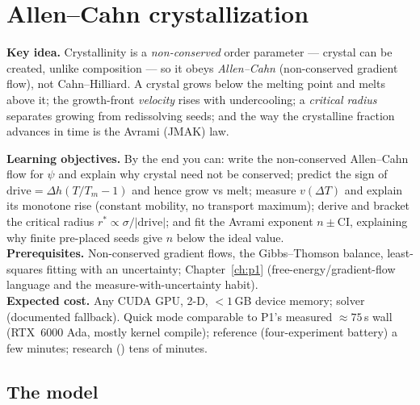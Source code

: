 \chapter{Allen--Cahn crystallization}
\label{ch:p6}

\begin{keybox}
\textbf{Key idea.} Crystallinity is a \emph{non-conserved} order parameter
--- crystal can be created, unlike composition --- so it obeys
\emph{Allen--Cahn} (non-conserved gradient flow), not Cahn--Hilliard. A
crystal grows below the melting point and melts above it; the growth-front
\emph{velocity} rises with undercooling; a \emph{critical radius}
separates growing from redissolving seeds; and the way the crystalline
fraction advances in time is the Avrami (JMAK) law.
\end{keybox}

\begin{keybox}
\textbf{Learning objectives.} By the end you can: write the non-conserved
Allen--Cahn flow for $\psi$ and explain why crystal need not be conserved;
predict the sign of $\text{drive}=\Delta h(T/T_m-1)$ and hence grow vs
melt; measure $v(\Delta T)$ and explain its monotone rise (constant
mobility, no transport maximum); derive and bracket the critical radius
$r^\ast\propto\sigma/|\text{drive}|$; and fit the Avrami exponent
$n\pm$CI, explaining why finite pre-placed seeds give $n$ below the ideal
value.\\[2pt]
\textbf{Prerequisites.} Non-conserved gradient flows, the Gibbs--Thomson
balance, least-squares fitting with an uncertainty; Chapter~\ref{ch:p1}
(free-energy/gradient-flow language and the measure-with-uncertainty
habit).\\[2pt]
\textbf{Expected cost.} Any CUDA GPU, 2-D, $<1$\,GB device memory;
solver  (documented  fallback). Quick mode
comparable to P1's measured $\approx75$\,s wall (RTX~6000 Ada, mostly
kernel compile); reference (four-experiment battery) a few minutes;
research () tens of minutes.
\end{keybox}

\section{The model}

